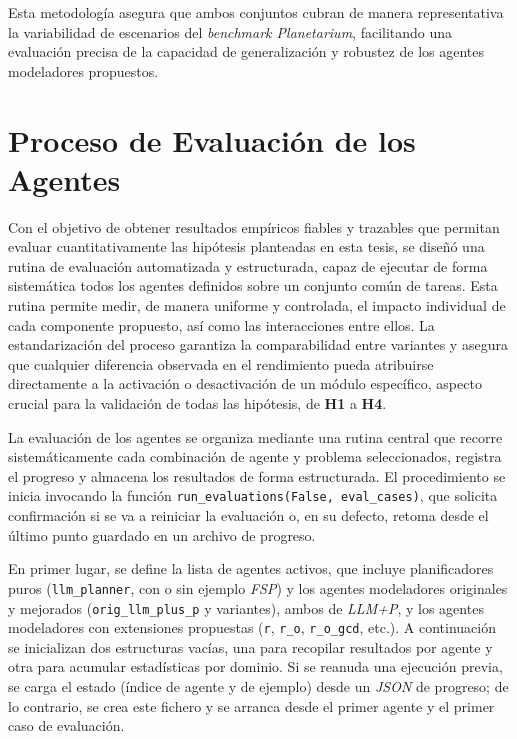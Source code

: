 Esta metodología asegura que ambos conjuntos cubran de manera representativa la variabilidad de escenarios del \textit{benchmark Planetarium}, facilitando una evaluación precisa de la capacidad de generalización y robustez de los agentes modeladores propuestos.

\section{Proceso de Evaluación de los Agentes}

Con el objetivo de obtener resultados empíricos fiables y trazables que permitan evaluar cuantitativamente las hipótesis planteadas en esta tesis, se diseñó una rutina de evaluación automatizada y estructurada, capaz de ejecutar de forma sistemática todos los agentes definidos sobre un conjunto común de tareas. Esta rutina permite medir, de manera uniforme y controlada, el impacto individual de cada componente propuesto, así como las interacciones entre ellos. La estandarización del proceso garantiza la comparabilidad entre variantes y asegura que cualquier diferencia observada en el rendimiento pueda atribuirse directamente a la activación o desactivación de un módulo específico, aspecto crucial para la validación de todas las hipótesis, de \textbf{H1} a \textbf{H4}.

La evaluación de los agentes se organiza mediante una rutina central que recorre sistemáticamente cada combinación de agente y problema seleccionados, registra el progreso y almacena los resultados de forma estructurada. El procedimiento se inicia invocando la función \texttt{run\_evaluations(False, eval\_cases)}, que solicita confirmación si se va a reiniciar la evaluación o, en su defecto, retoma desde el último punto guardado en un archivo de progreso.

En primer lugar, se define la lista de agentes activos, que incluye planificadores puros (\texttt{llm\_planner}, con o sin ejemplo \textit{FSP}) y los agentes modeladores originales y mejorados (\texttt{orig\_llm\_plus\_p} y variantes), ambos de \textit{LLM+P}, y los agentes modeladores con extensiones propuestas (\texttt{r}, \texttt{r\_o}, \texttt{r\_o\_gcd}, etc.). A continuación se inicializan dos estructuras vacías, una para recopilar resultados por agente y otra para acumular estadísticas por dominio. Si se reanuda una ejecución previa, se carga el estado (índice de agente y de ejemplo) desde un \textit{JSON} de progreso; de lo contrario, se crea este fichero y se arranca desde el primer agente y el primer caso de evaluación.

